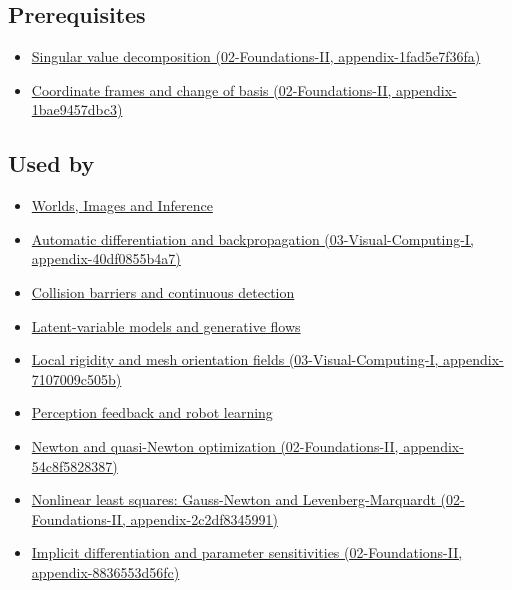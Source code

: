 \subsection{Prerequisites}\label{appendix-29f4bea4c2bb-prerequisites}

\begin{itemize}
\tightlist
\item
  \href{../02-Foundations-II/main.pdf\#nameddest=appendix-1fad5e7f36fa}{Singular value decomposition (02-Foundations-II, appendix-1fad5e7f36fa)}
\item
  \href{../02-Foundations-II/main.pdf\#nameddest=appendix-1bae9457dbc3}{Coordinate frames and change of basis (02-Foundations-II, appendix-1bae9457dbc3)}
\end{itemize}

\subsection{Used by}\label{appendix-29f4bea4c2bb-used-by}

\begin{itemize}
\item
  \href{Continuous\%20Notes/University\%20-\%20Worlds,\%20Images\%20and\%20Inference\%20-\%20Graphics,\%20Vision\%20and\%20Photography}{Worlds, Images and Inference}
\item
  \href{../03-Visual-Computing-I/main.pdf\#nameddest=appendix-40df0855b4a7}{Automatic differentiation and backpropagation (03-Visual-Computing-I, appendix-40df0855b4a7)}
\item
  \hyperref[appendix-a9ba01fa72a6]{Collision barriers and continuous detection}
\item
  \hyperref[appendix-2c568f05ee34]{Latent-variable models and generative flows}
\item
  \href{../03-Visual-Computing-I/main.pdf\#nameddest=appendix-7107009c505b}{Local rigidity and mesh orientation fields (03-Visual-Computing-I, appendix-7107009c505b)}
\item
  \hyperref[appendix-b0c42da325f1]{Perception feedback and robot learning}
\item
  \href{../02-Foundations-II/main.pdf\#nameddest=appendix-54c8f5828387}{Newton and quasi-Newton optimization (02-Foundations-II, appendix-54c8f5828387)}
\item
  \href{../02-Foundations-II/main.pdf\#nameddest=appendix-2c2df8345991}{Nonlinear least squares: Gauss-Newton and Levenberg-Marquardt (02-Foundations-II, appendix-2c2df8345991)}
\item
  \href{../02-Foundations-II/main.pdf\#nameddest=appendix-8836553d56fc}{Implicit differentiation and parameter sensitivities (02-Foundations-II, appendix-8836553d56fc)}
\end{itemize}

